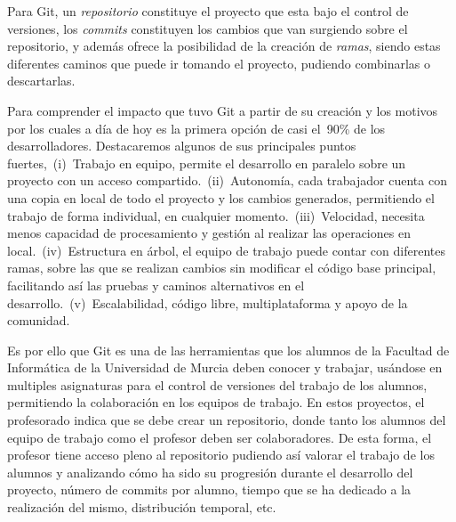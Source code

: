 Para Git, un \textit{repositorio} constituye el proyecto que esta bajo el
control de versiones, los \textit{commits} constituyen los cambios que van
surgiendo sobre el repositorio, y además ofrece la posibilidad de la
creación de \textit{ramas}, siendo estas diferentes caminos que puede ir
tomando el proyecto, pudiendo combinarlas o descartarlas.



Para comprender el impacto que tuvo Git a partir de su creación y los
motivos por los cuales a día de hoy es la primera opción de casi el~90\% de
los desarrolladores. Destacaremos algunos de sus principales puntos
fuertes,~(i)~Trabajo en equipo, permite el desarrollo en paralelo sobre un
proyecto con un acceso compartido.~(ii)~Autonomía, cada trabajador cuenta
con una copia en local de todo el proyecto y los cambios generados,
permitiendo el trabajo de forma individual, en cualquier
momento.~(iii)~Velocidad, necesita menos capacidad de procesamiento y
gestión al realizar las operaciones en local.~(iv)~Estructura en árbol, el
equipo de trabajo puede contar con diferentes ramas, sobre las que se
realizan cambios sin modificar el código base principal, facilitando así
las pruebas y caminos alternativos en el desarrollo.~(v)~Escalabilidad,
código libre, multiplataforma y apoyo de la comunidad.

Es por ello que Git es una de las herramientas que los alumnos de la
Facultad de Informática de la Universidad de Murcia deben conocer y
trabajar, usándose en multiples asignaturas para el control de versiones
del trabajo de los alumnos, permitiendo la colaboración en los equipos de
trabajo. En estos proyectos, el profesorado indica que se debe crear un
repositorio, donde tanto los alumnos del equipo de trabajo como el profesor
deben ser colaboradores. De esta forma, el profesor tiene acceso pleno al
repositorio pudiendo así valorar el trabajo de los alumnos y analizando
cómo ha sido su progresión durante el desarrollo del proyecto, número de
commits por alumno, tiempo que se ha dedicado a la realización del mismo,
distribución temporal, etc.

